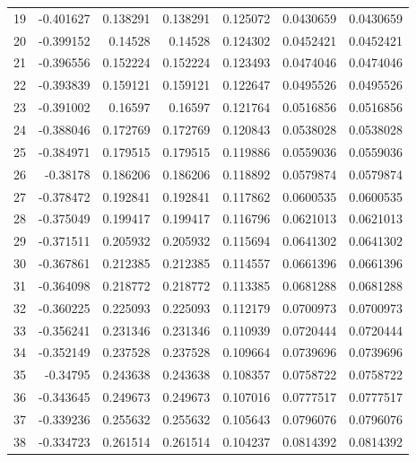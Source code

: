 \begin{tabular}{rrrrrrr}
  19 & -0.401627    & 0.138291    & 0.138291    &  0.125072    & 0.0430659   & 0.0430659   \\
  20 & -0.399152    & 0.14528     & 0.14528     &  0.124302    & 0.0452421   & 0.0452421   \\
  21 & -0.396556    & 0.152224    & 0.152224    &  0.123493    & 0.0474046   & 0.0474046   \\
  22 & -0.393839    & 0.159121    & 0.159121    &  0.122647    & 0.0495526   & 0.0495526   \\
  23 & -0.391002    & 0.16597     & 0.16597     &  0.121764    & 0.0516856   & 0.0516856   \\
  24 & -0.388046    & 0.172769    & 0.172769    &  0.120843    & 0.0538028   & 0.0538028   \\
  25 & -0.384971    & 0.179515    & 0.179515    &  0.119886    & 0.0559036   & 0.0559036   \\
  26 & -0.38178     & 0.186206    & 0.186206    &  0.118892    & 0.0579874   & 0.0579874   \\
  27 & -0.378472    & 0.192841    & 0.192841    &  0.117862    & 0.0600535   & 0.0600535   \\
  28 & -0.375049    & 0.199417    & 0.199417    &  0.116796    & 0.0621013   & 0.0621013   \\
  29 & -0.371511    & 0.205932    & 0.205932    &  0.115694    & 0.0641302   & 0.0641302   \\
  30 & -0.367861    & 0.212385    & 0.212385    &  0.114557    & 0.0661396   & 0.0661396   \\
  31 & -0.364098    & 0.218772    & 0.218772    &  0.113385    & 0.0681288   & 0.0681288   \\
  32 & -0.360225    & 0.225093    & 0.225093    &  0.112179    & 0.0700973   & 0.0700973   \\
  33 & -0.356241    & 0.231346    & 0.231346    &  0.110939    & 0.0720444   & 0.0720444   \\
  34 & -0.352149    & 0.237528    & 0.237528    &  0.109664    & 0.0739696   & 0.0739696   \\
  35 & -0.34795     & 0.243638    & 0.243638    &  0.108357    & 0.0758722   & 0.0758722   \\
  36 & -0.343645    & 0.249673    & 0.249673    &  0.107016    & 0.0777517   & 0.0777517   \\
  37 & -0.339236    & 0.255632    & 0.255632    &  0.105643    & 0.0796076   & 0.0796076   \\
  38 & -0.334723    & 0.261514    & 0.261514    &  0.104237    & 0.0814392   & 0.0814392   \\

\end{tabular}
